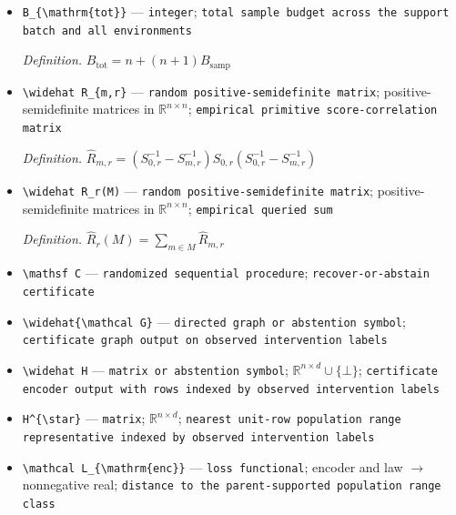 \documentclass{article}
\begin{document}
\begin{itemize}
  \item \texttt{B\_\allowbreak{}\{\textbackslash{}\allowbreak{}mathrm\{tot\}\allowbreak{}\}\allowbreak{}} --- \texttt{integer}; \texttt{total sample budget across the support batch and all environments}
  \par\smallskip\noindent\emph{Definition.} \(B_{\mathrm{tot}}=n+(n+1)B_{\mathrm{samp}}\)
  \item \texttt{\textbackslash{}\allowbreak{}widehat R\_\allowbreak{}\{m,\allowbreak{}r\}\allowbreak{}} --- \texttt{random positive-\allowbreak{}semidefinite matrix}; positive-semidefinite matrices in \(\mathbb R^{n\times n}\); \texttt{empirical primitive score-\allowbreak{}correlation matrix}
  \par\smallskip\noindent\emph{Definition.} \(\widehat R_{m,r}=(S_{0,r}^{-1}-S_{m,r}^{-1})S_{0,r}(S_{0,r}^{-1}-S_{m,r}^{-1})\)
  \item \texttt{\textbackslash{}\allowbreak{}widehat R\_\allowbreak{}r(M)} --- \texttt{random positive-\allowbreak{}semidefinite matrix}; positive-semidefinite matrices in \(\mathbb R^{n\times n}\); \texttt{empirical queried sum}
  \par\smallskip\noindent\emph{Definition.} \(\widehat R_r(M)=\sum_{m\in M}\widehat R_{m,r}\)
  \item \texttt{\textbackslash{}\allowbreak{}mathsf C} --- \texttt{randomized sequential procedure}; \texttt{recover-\allowbreak{}or-\allowbreak{}abstain certificate}
  \item \texttt{\textbackslash{}\allowbreak{}widehat\{\textbackslash{}\allowbreak{}mathcal G\}\allowbreak{}} --- \texttt{directed graph or abstention symbol}; \texttt{certificate graph output on observed intervention labels}
  \item \texttt{\textbackslash{}\allowbreak{}widehat H} --- \texttt{matrix or abstention symbol}; \(\mathbb R^{n\times d}\cup\{\bot\}\); \texttt{certificate encoder output with rows indexed by observed intervention labels}
  \item \texttt{H\textasciicircum{}\{\textbackslash{}\allowbreak{}star\}\allowbreak{}} --- \texttt{matrix}; \(\mathbb R^{n\times d}\); \texttt{nearest unit-\allowbreak{}row population range representative indexed by observed intervention labels}
  \item \texttt{\textbackslash{}\allowbreak{}mathcal L\_\allowbreak{}\{\textbackslash{}\allowbreak{}mathrm\{enc\}\allowbreak{}\}\allowbreak{}} --- \texttt{loss functional}; encoder and law \(\to\) nonnegative real; \texttt{distance to the parent-\allowbreak{}supported population range class}

\end{itemize}
\end{document}
